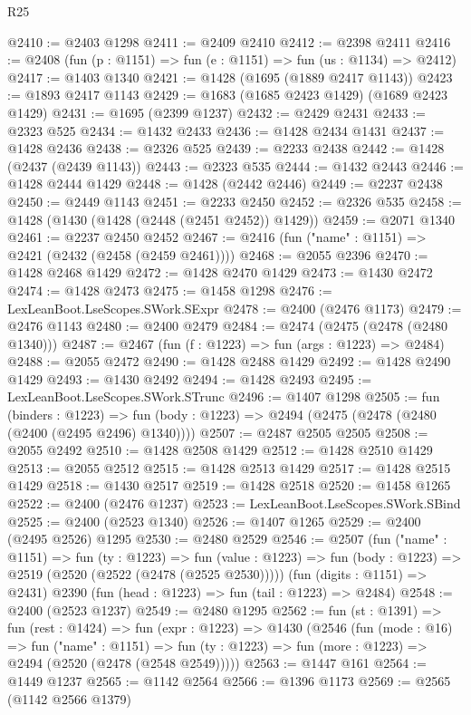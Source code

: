 \begin{lexlean}{R25}
\begin{coremodule}
@2410 := @2403 @1298
@2411 := @2409 @2410
@2412 := @2398 @2411
@2416 := @2408 (fun (p : @1151) => fun (e : @1151) => fun (us : @1134) => @2412)
@2417 := @1403 @1340
@2421 := @1428 (@1695 (@1889 @2417 @1143))
@2423 := @1893 @2417 @1143
@2429 := @1683 (@1685 @2423 @1429) (@1689 @2423 @1429)
@2431 := @1695 (@2399 @1237)
@2432 := @2429 @2431
@2433 := @2323 @525
@2434 := @1432 @2433
@2436 := @1428 @2434 @1431
@2437 := @1428 @2436
@2438 := @2326 @525
@2439 := @2233 @2438
@2442 := @1428 (@2437 (@2439 @1143))
@2443 := @2323 @535
@2444 := @1432 @2443
@2446 := @1428 @2444 @1429
@2448 := @1428 (@2442 @2446)
@2449 := @2237 @2438
@2450 := @2449 @1143
@2451 := @2233 @2450
@2452 := @2326 @535
@2458 := @1428 (@1430 (@1428 (@2448 (@2451 @2452)) @1429))
@2459 := @2071 @1340
@2461 := @2237 @2450 @2452
@2467 := @2416 (fun ("name" : @1151) => @2421 (@2432 (@2458 (@2459 @2461))))
@2468 := @2055 @2396
@2470 := @1428 @2468 @1429
@2472 := @1428 @2470 @1429
@2473 := @1430 @2472
@2474 := @1428 @2473
@2475 := @1458 @1298
@2476 := LexLeanBoot.LseScopes.SWork.SExpr
@2478 := @2400 (@2476 @1173)
@2479 := @2476 @1143
@2480 := @2400 @2479
@2484 := @2474 (@2475 (@2478 (@2480 @1340)))
@2487 := @2467 (fun (f : @1223) => fun (args : @1223) => @2484)
@2488 := @2055 @2472
@2490 := @1428 @2488 @1429
@2492 := @1428 @2490 @1429
@2493 := @1430 @2492
@2494 := @1428 @2493
@2495 := LexLeanBoot.LseScopes.SWork.STrunc
@2496 := @1407 @1298
@2505 := fun (binders : @1223) =>
  fun (body : @1223) => @2494 (@2475 (@2478 (@2480 (@2400 (@2495 @2496) @1340))))
@2507 := @2487 @2505 @2505
@2508 := @2055 @2492
@2510 := @1428 @2508 @1429
@2512 := @1428 @2510 @1429
@2513 := @2055 @2512
@2515 := @1428 @2513 @1429
@2517 := @1428 @2515 @1429
@2518 := @1430 @2517
@2519 := @1428 @2518
@2520 := @1458 @1265
@2522 := @2400 (@2476 @1237)
@2523 := LexLeanBoot.LseScopes.SWork.SBind
@2525 := @2400 (@2523 @1340)
@2526 := @1407 @1265
@2529 := @2400 (@2495 @2526) @1295
@2530 := @2480 @2529
@2546 := @2507
    (fun ("name" : @1151) =>
    fun (ty : @1223) =>
    fun (value : @1223) => fun (body : @1223) => @2519 (@2520 (@2522 (@2478 (@2525 @2530)))))
    (fun (digits : @1151) => @2431)
    @2390
    (fun (head : @1223) => fun (tail : @1223) => @2484)
@2548 := @2400 (@2523 @1237)
@2549 := @2480 @1295
@2562 := fun (st : @1391) =>
  fun (rest : @1424) =>
  fun (expr : @1223) =>
  @1430
    (@2546
      (fun (mode : @16) =>
      fun ("name" : @1151) =>
      fun (ty : @1223) => fun (more : @1223) => @2494 (@2520 (@2478 (@2548 @2549)))))
@2563 := @1447 @161
@2564 := @1449 @1237
@2565 := @1142 @2564
@2566 := @1396 @1173
@2569 := @2565 (@1142 @2566 @1379)

\end{coremodule}
\end{lexlean}
